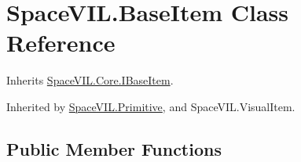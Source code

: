 \hypertarget{class_space_v_i_l_1_1_base_item}{}\section{Space\+V\+I\+L.\+Base\+Item Class Reference}
\label{class_space_v_i_l_1_1_base_item}


Inherits \mbox{\hyperlink{interface_space_v_i_l_1_1_core_1_1_i_base_item}{Space\+V\+I\+L.\+Core.\+I\+Base\+Item}}.



Inherited by \mbox{\hyperlink{class_space_v_i_l_1_1_primitive}{Space\+V\+I\+L.\+Primitive}}, and Space\+V\+I\+L.\+Visual\+Item.

\subsection*{Public Member Functions}
